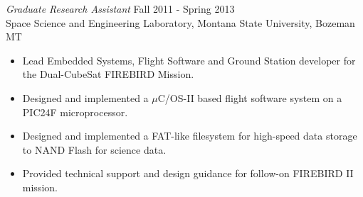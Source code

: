 \documentclass[line,margin]{res}
\begin{document}
\begin{resume}
\begin{itemize}
                \end{itemize}


                 {\sl Graduate Research Assistant} \hfill Fall 2011 - Spring 2013 \\
                Space Science and Engineering Laboratory,
                Montana State University, Bozeman MT
                 \begin{itemize}  \itemsep -2pt %
                 \item Lead Embedded Systems, Flight Software and Ground Station developer for the Dual-CubeSat FIREBIRD Mission.
                 \item Designed and implemented a $\mu$C/OS-II based flight software system on a PIC24F microprocessor.
	      		 \item Designed and implemented a FAT-like filesystem for high-speed data storage to NAND Flash for science data.
	      		 \item Provided technical support and design guidance for follow-on FIREBIRD II mission.
                 
                \end{itemize}
 
                 


\end{resume}
\end{document}
